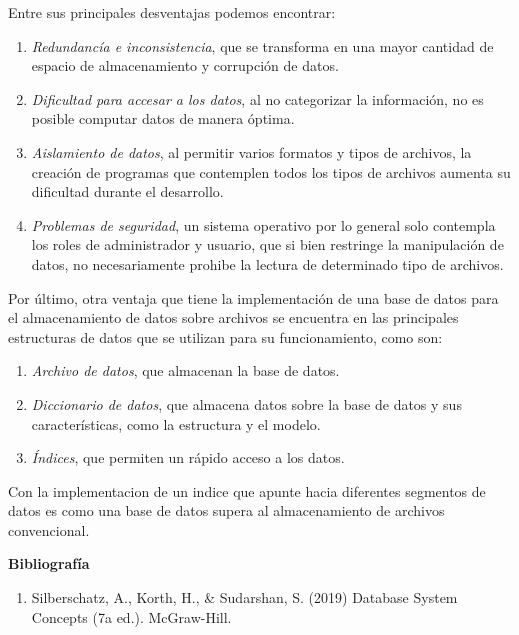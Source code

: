 \documentclass[a4paper,12pt]{report}
\begin{document}
Entre sus principales desventajas podemos encontrar:\\
\begin{enumerate}
		\item\emph{Redundancía e inconsistencia}, que se transforma en una mayor cantidad de espacio de almacenamiento y corrupción de datos.
		\item\emph{Dificultad para accesar a los datos}, al no categorizar la información, no es posible computar datos de manera óptima.
		\item\emph{Aislamiento de datos}, al permitir varios formatos y tipos de archivos, la creación de programas que contemplen todos los tipos de archivos aumenta su dificultad durante el desarrollo.
		\item\emph{Problemas de seguridad}, un sistema operativo por lo general solo contempla los roles de administrador y usuario, que si bien restringe la manipulación de datos, no necesariamente prohibe la lectura de determinado tipo de archivos.
\end{enumerate}

Por último, otra ventaja que tiene la implementación de una base de datos para el almacenamiento de datos sobre archivos se encuentra en las principales estructuras de datos que se utilizan para su funcionamiento, como son: \\
\begin{enumerate}
\item\emph{Archivo de datos}, que almacenan la base de datos.
\item\emph{Diccionario de datos}, que almacena datos sobre la base de datos y sus características, como la estructura y el modelo.
\item\emph{Índices}, que permiten un rápido acceso a los datos.
\end{enumerate}

Con la implementacion de un indice que apunte hacia diferentes segmentos de datos es como una base de datos supera al almacenamiento de archivos convencional.

\newpage

\textbf{Bibliografía}

\begin{enumerate}
	\item Silberschatz, A., Korth, H., \& Sudarshan, S. (2019) Database System Concepts (7a ed.). McGraw-Hill.
\end{enumerate}
\end{document}
